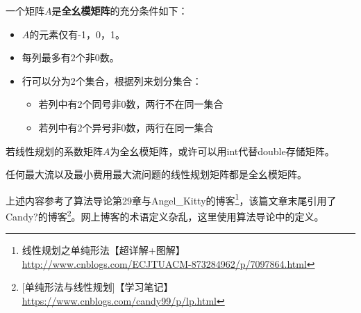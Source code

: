 一个矩阵$A$是{\bfseries 全幺模矩阵}的充分条件如下：
\begin{itemize}
    \item $A$的元素仅有-1，0，1。
    \item 每列最多有2个非0数。
    \item 行可以分为2个集合，根据列来划分集合：
    \begin{itemize}
        \item 若列中有2个同号非0数，两行不在同一集合
        \item 若列中有2个异号非0数，两行在同一集合
    \end{itemize}
\end{itemize}

若线性规划的系数矩阵$A$为全幺模矩阵，或许可以用int代替double存储矩阵。

任何最大流以及最小费用最大流问题的线性规划矩阵都是全幺模矩阵。

上述内容参考了算法导论\cite{ITA3}第29章与Angel\_Kitty的博客\footnote{
    线性规划之单纯形法【超详解+图解】
    \url{http://www.cnblogs.com/ECJTUACM-873284962/p/7097864.html}
}，该篇文章末尾引用了Candy?的博客\footnote{
    [单纯形法与线性规划]【学习笔记】
    \url{https://www.cnblogs.com/candy99/p/lp.html}
}。网上博客的术语定义杂乱，这里使用算法导论中的定义。
